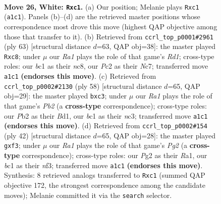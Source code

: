 \documentclass[11pt]{article}
\begin{document}
\clearpage

\begin{figure}[p]\centering
\begin{subfigure}{0.46\textwidth}\centering
\resizebox{\linewidth}{!}{%
\newchessgame
\chessboard[
  setfen={rn2k3/2Q5/3p4/pb1Ppp2/6p1/8/PPP2PP1/R1b1K3 w q - 0 26},
  showmover=false,
  pgfstyle=straightmove, color=movearrow, markmove={a1-c1}
]}
\caption{}
\end{subfigure}\hfill
\begin{subfigure}{0.46\textwidth}\centering
\resizebox{\linewidth}{!}{%
\newchessgame
\chessboard[
  setfen={2Nr2k1/p1n4p/4ppp1/8/rB5P/6P1/P4PB1/2R3K1 b - - 0 32},
  showmover=false,
  pgfstyle=straightmove, color=movearrow, markmove={d8-c8}
]}
\caption{}
\end{subfigure}
\\[4pt]
\begin{subfigure}{0.46\textwidth}\centering
\resizebox{\linewidth}{!}{%
\newchessgame
\chessboard[
  setfen={r5k1/pb3p2/1p5R/4p3/8/P1n1P2P/1P4P1/3B2K1 w - - 0 30},
  showmover=false,
  pgfstyle=straightmove, color=movearrow, markmove={b2-c3}
]}
\caption{}
\end{subfigure}\hfill
\begin{subfigure}{0.46\textwidth}\centering
\resizebox{\linewidth}{!}{%
\newchessgame
\chessboard[
  setfen={r5k1/p1R5/1p2p1p1/2p5/4r3/2P2n2/P4PPP/R4K2 w - - 0 22},
  showmover=false,
  pgfstyle=straightmove, color=movearrow, markmove={g2-f3}
]}
\caption{}
\end{subfigure}
\caption{\textbf{Move 26, White: \texttt{Rxc1}.} (a) Our position; Melanie plays \texttt{Rxc1} (\texttt{a1c1}). Panels (b)--(d) are the retrieved master positions whose correspondence most drove this move (highest QAP objective among those that transfer to it). (b) Retrieved from \texttt{ccrl\_top\_p0001\#2961} (ply 63) [structural distance $d$=63, QAP obj=38]: the master played \texttt{Rxc8}; under $\mu$ our \emph{Ra1} plays the role of that game's \emph{Rd1}; cross-type roles: our \emph{b}c1 as their \emph{n}c8, our \emph{P}c2 as their \emph{N}c7; transferred move \texttt{a1c1} \textbf{(endorses this move)}. (c) Retrieved from \texttt{ccrl\_top\_p0002\#2130} (ply 58) [structural distance $d$=65, QAP obj=29]: the master played \texttt{bxc3}; under $\mu$ our \emph{Ra1} plays the role of that game's \emph{Pb2} (a \textbf{cross-type} correspondence); cross-type roles: our \emph{P}b2 as their \emph{B}d1, our \emph{b}c1 as their \emph{n}c3; transferred move \texttt{a1c1} \textbf{(endorses this move)}. (d) Retrieved from \texttt{ccrl\_top\_p0002\#154} (ply 42) [structural distance $d$=65, QAP obj=28]: the master played \texttt{gxf3}; under $\mu$ our \emph{Ra1} plays the role of that game's \emph{Pg2} (a \textbf{cross-type} correspondence); cross-type roles: our \emph{P}g2 as their \emph{R}a1, our \emph{b}c1 as their \emph{n}f3; transferred move \texttt{a1c1} \textbf{(endorses this move)}. Synthesis: 8 retrieved analogs transferred to \texttt{Rxc1} (summed QAP objective 172, the strongest correspondence among the candidate moves); Melanie committed it via the \texttt{search} selector.}
\label{fig:thought-m50}
\end{figure}
\end{document}
